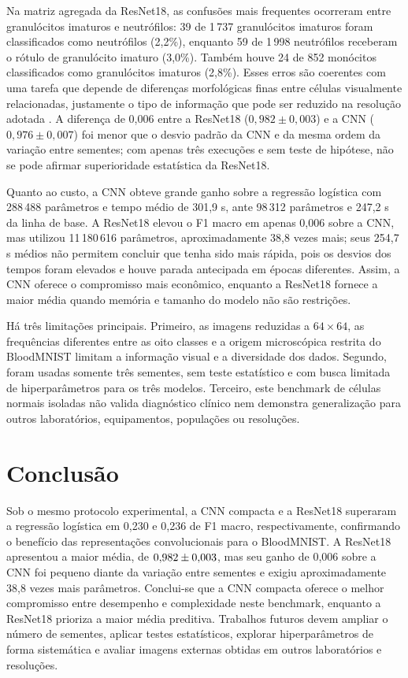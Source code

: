 \documentclass[conference]{IEEEtran}
\begin{document}
Na matriz agregada da ResNet18, as confusões mais frequentes ocorreram entre granulócitos imaturos e neutrófilos: 39 de 1\,737 granulócitos imaturos foram classificados como neutrófilos (2,2\%), enquanto 59 de 1\,998 neutrófilos receberam o rótulo de granulócito imaturo (3,0\%).
Também houve 24 de 852 monócitos classificados como granulócitos imaturos (2,8\%).
Esses erros são coerentes com uma tarefa que depende de diferenças morfológicas finas entre células visualmente relacionadas, justamente o tipo de informação que pode ser reduzido na resolução adotada \cite{acevedo2020dataset}.
A diferença de 0,006 entre a ResNet18 ($0{,}982\pm0{,}003$) e a CNN ($0{,}976\pm0{,}007$) foi menor que o desvio padrão da CNN e da mesma ordem da variação entre sementes; com apenas três execuções e sem teste de hipótese, não se pode afirmar superioridade estatística da ResNet18.

Quanto ao custo, a CNN obteve grande ganho sobre a regressão logística com 288\,488 parâmetros e tempo médio de 301,9 s, ante 98\,312 parâmetros e 247,2 s da linha de base.
A ResNet18 elevou o F1 macro em apenas 0,006 sobre a CNN, mas utilizou 11\,180\,616 parâmetros, aproximadamente 38,8 vezes mais; seus 254,7 s médios não permitem concluir que tenha sido mais rápida, pois os desvios dos tempos foram elevados e houve parada antecipada em épocas diferentes.
Assim, a CNN oferece o compromisso mais econômico, enquanto a ResNet18 fornece a maior média quando memória e tamanho do modelo não são restrições.

Há três limitações principais.
Primeiro, as imagens reduzidas a $64\times64$, as frequências diferentes entre as oito classes e a origem microscópica restrita do BloodMNIST limitam a informação visual e a diversidade dos dados.
Segundo, foram usadas somente três sementes, sem teste estatístico e com busca limitada de hiperparâmetros para os três modelos.
Terceiro, este benchmark de células normais isoladas não valida diagnóstico clínico nem demonstra generalização para outros laboratórios, equipamentos, populações ou resoluções.

\section{Conclusão}
\label{sec:conclusao}
Sob o mesmo protocolo experimental, a CNN compacta e a ResNet18 superaram a regressão logística em 0,230 e 0,236 de F1 macro, respectivamente, confirmando o benefício das representações convolucionais para o BloodMNIST.
A ResNet18 apresentou a maior média, de $0{,}982 \pm 0{,}003$, mas seu ganho de 0,006 sobre a CNN foi pequeno diante da variação entre sementes e exigiu aproximadamente 38,8 vezes mais parâmetros.
Conclui-se que a CNN compacta oferece o melhor compromisso entre desempenho e complexidade neste benchmark, enquanto a ResNet18 prioriza a maior média preditiva.
Trabalhos futuros devem ampliar o número de sementes, aplicar testes estatísticos, explorar hiperparâmetros de forma sistemática e avaliar imagens externas obtidas em outros laboratórios e resoluções.
\end{document}
